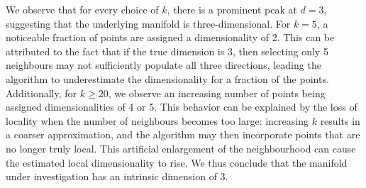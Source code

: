 \documentclass[11pt]{article}
\begin{document}
		We observe that for every choice of $k$, there is a prominent peak at $d = 3$, suggesting that the underlying manifold is three-dimensional. For $k = 5$, a noticeable fraction of points are assigned a dimensionality of 2. This can be attributed to the fact that if the true dimension is 3, then selecting only 5 neighbours may not sufficiently populate all three directions, leading the algorithm to underestimate the dimensionality for a fraction of the points. 
		Additionally, for $k \geq 20$, we observe an increasing number of points being assigned dimensionalities of 4 or 5. This behavior can be explained by the loss of locality when the number of neighbours becomes too large: increasing $k$ results in a coarser approximation, and the algorithm may then incorporate points that are no longer truly local. This artificial enlargement of the neighbourhood can cause the estimated local dimensionality to rise.
		We thus conclude that the manifold under investigation has an intrinsic dimension of 3.
		
		
\end{document}
